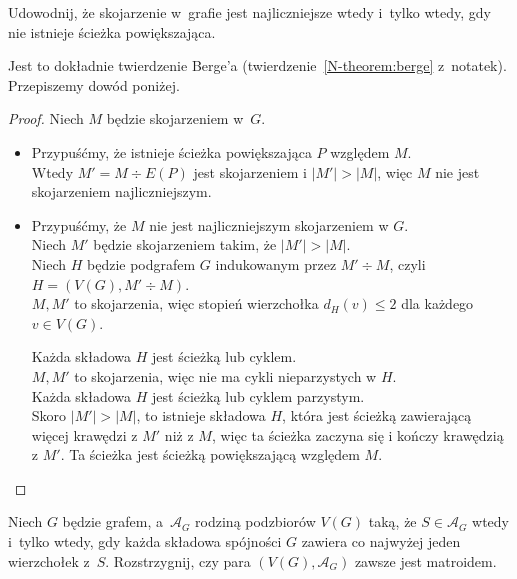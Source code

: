 \clearpage
\begin{zadanie}
	Udowodnij, że skojarzenie w~grafie jest najliczniejsze wtedy i~tylko wtedy,
	gdy nie istnieje ścieżka powiększająca.
\end{zadanie}

Jest to dokładnie twierdzenie Berge'a (twierdzenie~\ref*{N-theorem:berge} z~notatek). Przepiszemy dowód poniżej.

\begin{proof}
	Niech $M$ będzie skojarzeniem w~$G$.
	\begin{itemize}
		\item[$\implies$]
		      Przypuśćmy, że istnieje ścieżka powiększająca $P$ względem $M$. \\
		      Wtedy $M' = M \div E(P)$ jest skojarzeniem i $|M'| > |M|$, więc $M$ nie jest skojarzeniem najliczniejszym.
		\item[$\impliedby$]
		      Przypuśćmy, że $M$ nie jest najliczniejszym skojarzeniem w $G$. \\
		      Niech $M'$ będzie skojarzeniem takim, że $|M'| > |M|$. \\
		      Niech $H$ będzie podgrafem $G$ indukowanym przez $M' \div M$, czyli $H = (V(G), M' \div M)$. \\
		      $M, M'$ to skojarzenia, więc stopień wierzchołka $d_H(v) \le 2$ dla każdego $v \in V(G)$.

		      Każda składowa $H$ jest ścieżką lub cyklem. \\
		      $M, M'$ to skojarzenia, więc nie ma cykli nieparzystych w $H$. \\
		      Każda składowa $H$ jest ścieżką lub cyklem parzystym. \\
		      Skoro $|M'| > |M|$, to istnieje składowa $H$, która jest ścieżką zawierającą więcej krawędzi z $M'$ niż z $M$, więc ta ścieżka zaczyna się i kończy krawędzią z $M'$. Ta ścieżka jest ścieżką powiększającą względem $M$. \qedhere
	\end{itemize}
\end{proof}

\clearpage
\begin{zadanie}
	Niech $G$ będzie grafem, a~$\mathcal{A}_G$ rodziną podzbiorów $V(G)$ taką, że
	$S\in\mathcal{A}_G$ wtedy i~tylko wtedy, gdy każda składowa spójności $G$
	zawiera co najwyżej jeden wierzchołek z~$S$. Rozstrzygnij, czy para
	$(V(G),\mathcal{A}_G)$ zawsze jest matroidem.
\end{zadanie}

